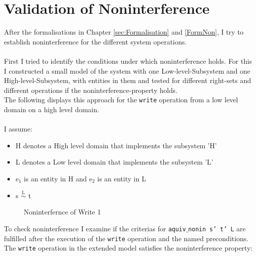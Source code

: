 \chapter{Validation of Noninterference}\label{ValNon}
After the formalisations in Chapter \ref{sec:Formalisation} and \ref{FormNon}, I try to establish noninterference for the different system operations.\\ \\
First I tried to identify the conditions under which noninterference holds. For this I constructed a small model of the system with one Low-level-Subsystem and one High-level-Subsystem, with entities in them and tested for different right-sets and different operations if the noninterference-property holds. \\
The following displays this approach for the \texttt{write} operation from a low level domain on a high level domain. \\ \\
I assume: \\ 
\begin{itemize}
\item H denotes a High level domain that implements the subsystem 'H'
\item L denotes a Low level domain that implements the subsystem 'L'
\item e$_1$ is an entity in H and e$_2$ is an entity in L
\item s $\overset{\text{L}}{\sim}$ t
\end{itemize} 
\begin{figure}[H]
\caption{Noninterfernce of Write 1}
\end{figure}
To check noninterference I examine if the criterias for \texttt{aquiv$\_$nonin s' t' L} are fulfilled after the execution of the \texttt{write} operation and the named preconditions. \\ 
The \texttt{write} operation in the extended model satisfies the noninterference property: 
